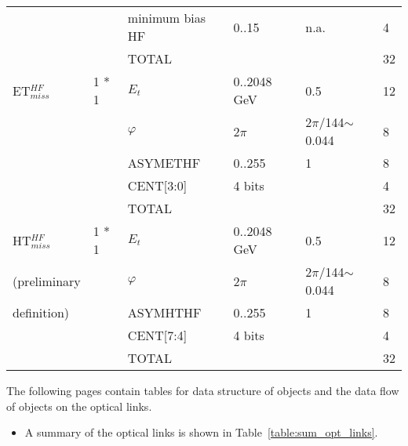 \documentclass{cmspaper}
\begin{document}
\begin{table}[ht]
\begin{tabular}{| l | l | l | l | l | l |}
    &       &   minimum bias HF &      0..15    &   n.a.    &   4                    \\
    &       &   TOTAL   &       &       &   32                    \\
\hline
ET$_{miss}^{HF}$	&	1 * 1	&   $E_t$   &   0..2048 GeV &   0.5 &   12                    \\
	&		&   $\varphi$   &   2$\pi$  &   2$\pi$/144$\sim$0.044   &   8                    \\
    &       &   ASYMETHF    &  0..255     &    1   &   8                    \\
    &       &   CENT[3:0]    &  4 bits    &       &   4                    \\
	&		&	TOTAL	&		&		&	32                    \\
\hline
HT$_{miss}^{HF}$	&	1 * 1	&   $E_t$   &   0..2048 GeV &   0.5 &   12                    \\
(preliminary	&		&   $\varphi$   &   2$\pi$  &   2$\pi$/144$\sim$0.044   &   8                    \\
definition)	&		&	ASYMHTHF	&	0..255 &	1 &	8                    \\
    &       &   CENT[7:4]    & 4 bits     &       &   4                    \\
	&		&	TOTAL	&		&		&	32                    \\
\hline
\end{tabular}
\label{table:scales_table_2}
\end{table}

\clearpage

The following pages contain tables for data structure of objects and the data flow of objects on the optical links.

\begin{itemize}
\item A summary of the optical links is shown in Table~\ref{table:sum_opt_links}.
\end{itemize}
\end{document}
